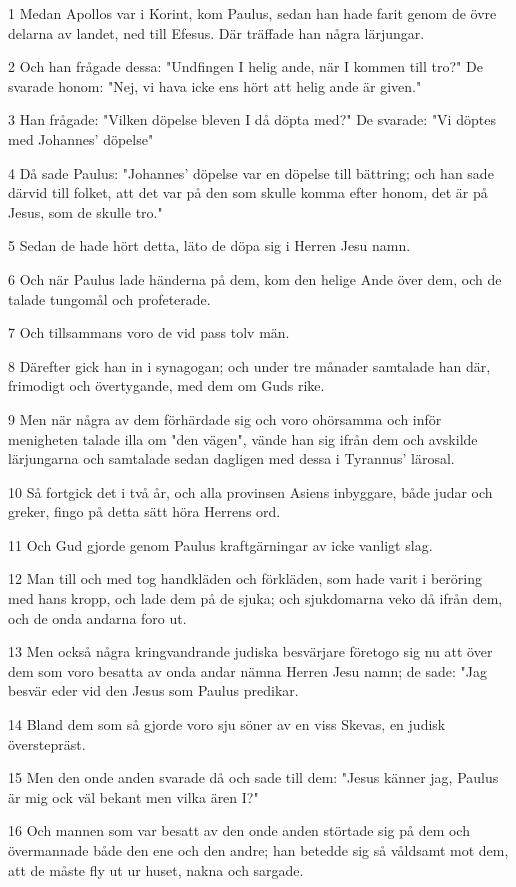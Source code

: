 \par 1 Medan Apollos var i Korint, kom Paulus, sedan han hade farit genom de övre delarna av landet, ned till Efesus. Där träffade han några lärjungar.
\par 2 Och han frågade dessa: "Undfingen I helig ande, när I kommen till tro?" De svarade honom: "Nej, vi hava icke ens hört att helig ande är given."
\par 3 Han frågade: "Vilken döpelse bleven I då döpta med?" De svarade: "Vi döptes med Johannes' döpelse"
\par 4 Då sade Paulus: "Johannes' döpelse var en döpelse till bättring; och han sade därvid till folket, att det var på den som skulle komma efter honom, det är på Jesus, som de skulle tro."
\par 5 Sedan de hade hört detta, läto de döpa sig i Herren Jesu namn.
\par 6 Och när Paulus lade händerna på dem, kom den helige Ande över dem, och de talade tungomål och profeterade.
\par 7 Och tillsammans voro de vid pass tolv män.
\par 8 Därefter gick han in i synagogan; och under tre månader samtalade han där, frimodigt och övertygande, med dem om Guds rike.
\par 9 Men när några av dem förhärdade sig och voro ohörsamma och inför menigheten talade illa om "den vägen", vände han sig ifrån dem och avskilde lärjungarna och samtalade sedan dagligen med dessa i Tyrannus' lärosal.
\par 10 Så fortgick det i två år, och alla provinsen Asiens inbyggare, både judar och greker, fingo på detta sätt höra Herrens ord.
\par 11 Och Gud gjorde genom Paulus kraftgärningar av icke vanligt slag.
\par 12 Man till och med tog handkläden och förkläden, som hade varit i beröring med hans kropp, och lade dem på de sjuka; och sjukdomarna veko då ifrån dem, och de onda andarna foro ut.
\par 13 Men också några kringvandrande judiska besvärjare företogo sig nu att över dem som voro besatta av onda andar nämna Herren Jesu namn; de sade: "Jag besvär eder vid den Jesus som Paulus predikar.
\par 14 Bland dem som så gjorde voro sju söner av en viss Skevas, en judisk överstepräst.
\par 15 Men den onde anden svarade då och sade till dem: "Jesus känner jag, Paulus är mig ock väl bekant men vilka ären I?"
\par 16 Och mannen som var besatt av den onde anden störtade sig på dem och övermannade både den ene och den andre; han betedde sig så våldsamt mot dem, att de måste fly ut ur huset, nakna och sargade.
